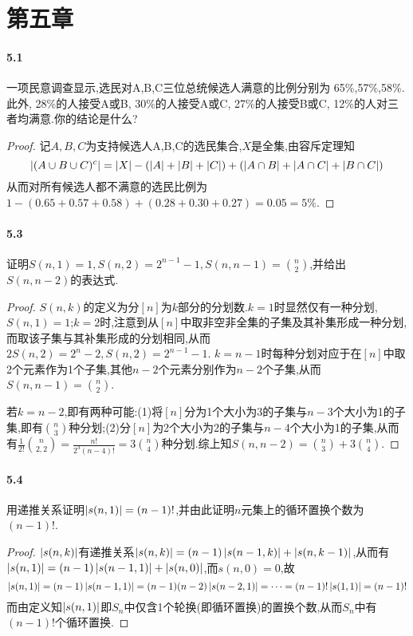 \documentclass{article}
\begin{document}
\section{第五章}
\paragraph{5.1}一项民意调查显示,选民对A,B,C三位总统候选人满意的比例分别为 65\%,57\%,58\%.此外, 28\%的人接受A或B, 30\%的人接受A或C, 27\%的人接受B或C, 12\%的人对三者均满意.你的结论是什么?
\begin{proof}
    记$A,B,C$为支持候选人A,B,C的选民集合,$X$是全集,由容斥定理知
    $$\left|(A\cup B\cup C)^c\right|=\left|X\right|-(\left|A\right|+\left|B\right|+\left|C\right|)+(\left|A\cap B\right|+\left|A\cap C\right|+\left|B\cap C\right|)$$
    从而对所有候选人都不满意的选民比例为$1-(0.65+0.57+0.58)+(0.28+0.30+0.27)=0.05=5\%$.
\end{proof}

\paragraph{5.3}证明$S(n,1)=1, S(n,2)=2^{n-1}-1, S(n,n-1)=\binom{n}{2}$,并给出$S(n,n-2)$的表达式.
\begin{proof}
    $S(n,k)$的定义为分$[n]$为$k$部分的分划数.$k=1$时显然仅有一种分划,$S(n,1)=1$;$k=2$时,注意到从$[n]$中取非空非全集的子集及其补集形成一种分划,而取该子集与其补集形成的分划相同,从而$2S(n,2)=2^n-2, S(n,2)=2^{n-1}-1$. $k=n-1$时每种分划对应于在$[n]$中取2个元素作为1个子集,其他$n-2$个元素分别作为$n-2$个子集,从而$S(n,n-1)=\binom{n}{2}$.

    若$k=n-2$,即有两种可能:(1)将$[n]$分为1个大小为3的子集与$n-3$个大小为1的子集,即有$\binom{n}{3}$种分划;(2)分$[n]$为2个大小为2的子集与$n-4$个大小为1的子集,从而有$\frac{1}{2!}\binom{n}{2,2}=\frac{n!}{2^3(n-4)!}=3\binom{n}{4}$种分划.综上知$S(n,n-2)=\binom{n}{3}+3\binom{n}{4}$.
\end{proof}

\paragraph{5.4}用递推关系证明$\left|s(n,1)\right|=(n-1)!$,并由此证明$n$元集上的循环置换个数为$(n-1)!$.
\begin{proof}
    $\left|s(n,k)\right|$有递推关系$\left|s(n,k)\right|=(n-1)\left|s(n-1,k)\right|+\left|s(n,k-1)\right|$,从而有$\left|s(n,1)\right|=(n-1)\left|s(n-1,1)\right|+\left|s(n,0)\right|$,而$s(n,0)=0$,故
    $$\left|s(n,1)\right|=(n-1)\left|s(n-1,1)\right|=(n-1)(n-2)\left|s(n-2,1)\right|=\cdots=(n-1)!\left|s(1,1)\right|=(n-1)!$$
    而由定义知$\left|s(n,1)\right|$即$S_n$中仅含1个轮换(即循环置换)的置换个数,从而$S_n$中有$(n-1)!$个循环置换.
\end{proof}
\end{document}
